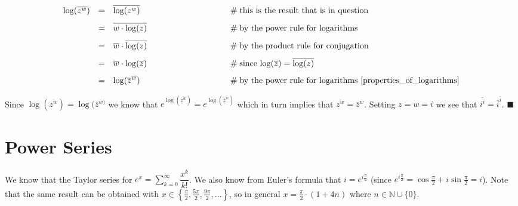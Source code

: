 \documentclass{article}
\theoremstyle{definition}
\begin{document}
\smallskip
\begin{equation*}
\begin{array}{llll}
\log(\overline{z^w})
&=& \overline{\log(z^w)}                        &\hspace{9em} \mathrel{\#} \text{this is the result that is in question} \\
[8pt]
&=& \overline{w  \cdot \log(z)}					&\hspace{9em} \mathrel{\#} \text{by the power rule for logarithms} \\
[8pt]
&=& \overline{w} \cdot \overline{\log(z)}       &\hspace{9em} \mathrel{\#} \text{by the product rule for conjugation} \\
[8pt]
&=& \overline{w} \cdot \log(\overline{z})       &\hspace{9em} \mathrel{\#} \text{since $\log (\overline{z}) 
												= \overline{\log(z)}$} \\
[8pt]
&=& \log(\overline{z}^{\overline{w}})           &\hspace{9em} \mathrel{\#} \text{by the power rule for 
												logarithms \cite{properties_of_logarithms}}
\end{array}
\end{equation*}

\bigskip
{
\noindent
Since $\log(\overline{z^w}) = \log(\overline{z}^{\overline{w})}$ we know that 
$e^{\log(\overline{z^w})} = e^{\log(\overline{z}^{\overline{w}})}$ which in turn 
implies that $\overline{z^w} = \overline{z}^{\overline{w}}$. Setting $z=w=i$ we 
see that $\overline{i^i} = {\overline{i}}^{\overline{i}}$. $\blacksquare$
\par}
\bigskip


\section{Power Series}
\label{sec:power_series}

{ We know that the Taylor series
\cite{wiki:taylor} for $e^x = \sum\limits_{k=0}^{\infty}
\dfrac{x^k}{k!}$.  We also know from Euler's formula
\cite{notes:eulers_formula} that $i = e^{i \frac{\pi}{2}}$ (since
$e^{i\frac{\pi}{2}} = \cos \frac{\pi}{2} + i \sin \frac{\pi}{2} =
i$).  Note that the same result can be obtained with $x \in \left
\{\frac{\pi}{2}, \frac{5 \pi}{2}, \frac{9\pi}{2}, \hdots \right
\}$, so in general $x = \frac{\pi}{2} \cdot (1+4n)$ where $n \in
\mathbb{N} \cup \{0\}$.  \par}
\end{document}
